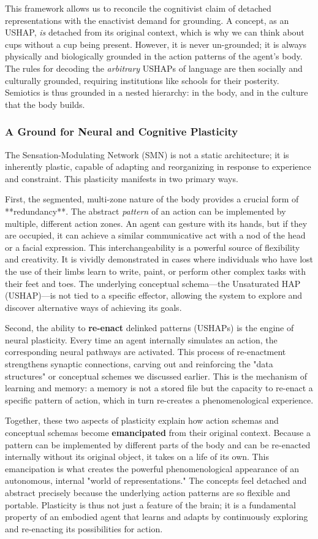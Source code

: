 This framework allows us to reconcile the cognitivist claim of detached representations with the enactivist demand for grounding. A concept, as an USHAP, \textit{is} detached from its original context, which is why we can think about cups without a cup being present. However, it is never un-grounded; it is always physically and biologically grounded in the action patterns of the agent's body. The rules for decoding the \textit{arbitrary} USHAPs of language are then socially and culturally grounded, requiring institutions like schools for their posterity. Semiotics is thus grounded in a nested hierarchy: in the body, and in the culture that the body builds.

\subsubsection{A Ground for Neural and Cognitive Plasticity}
\label{ssubsec:plasticity}
The Sensation-Modulating Network (SMN) is not a static architecture; it is inherently plastic, capable of adapting and reorganizing in response to experience and constraint. This plasticity manifests in two primary ways.

First, the segmented, multi-zone nature of the body provides a crucial form of **redundancy**. The abstract \textit{pattern} of an action can be implemented by multiple, different action zones. An agent can gesture with its hands, but if they are occupied, it can achieve a similar communicative act with a nod of the head or a facial expression. This interchangeability is a powerful source of flexibility and creativity. It is vividly demonstrated in cases where individuals who have lost the use of their limbs learn to write, paint, or perform other complex tasks with their feet and toes. The underlying conceptual schema—the Unsaturated HAP (USHAP)—is not tied to a specific effector, allowing the system to explore and discover alternative ways of achieving its goals.

Second, the ability to \textbf{re-enact} delinked patterns (USHAPs) is the engine of neural plasticity. Every time an agent internally simulates an action, the corresponding neural pathways are activated. This process of re-enactment strengthens synaptic connections, carving out and reinforcing the "data structures" or conceptual schemes we discussed earlier. This is the mechanism of learning and memory: a memory is not a stored file but the capacity to re-enact a specific pattern of action, which in turn re-creates a phenomenological experience.

Together, these two aspects of plasticity explain how action schemas and conceptual schemas become \textbf{emancipated} from their original context. Because a pattern can be implemented by different parts of the body and can be re-enacted internally without its original object, it takes on a life of its own. This emancipation is what creates the powerful phenomenological appearance of an autonomous, internal "world of representations." The concepts feel detached and abstract precisely because the underlying action patterns are so flexible and portable. Plasticity is thus not just a feature of the brain; it is a fundamental property of an embodied agent that learns and adapts by continuously exploring and re-enacting its possibilities for action.